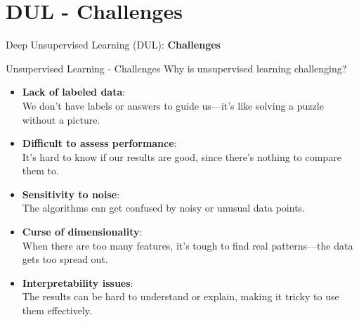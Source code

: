 \section{DUL - Challenges}
\begin{frame}{}
    \LARGE Deep Unsupervised Learning (DUL): \textbf{Challenges}
\end{frame}

\begin{frame}[allowframebreaks]{Unsupervised Learning - Challenges}
    Why is unsupervised learning challenging?
    \begin{itemize}
        \setlength{\itemsep}{-0.3em}
        \item \textbf{Lack of labeled data}: \\ We don't have labels or answers to guide us—it's like solving a puzzle without a picture.
        \item \textbf{Difficult to assess performance}: \\ It's hard to know if our results are good, since there's nothing to compare them to.
        \item \textbf{Sensitivity to noise}: \\ The algorithms can get confused by noisy or unusual data points.
        \item \textbf{Curse of dimensionality}: \\ When there are too many features, it's tough to find real patterns—the data gets too spread out.
        \item \textbf{Interpretability issues}: \\ The results can be hard to understand or explain, making it tricky to use them effectively.
    \end{itemize}
\end{frame}